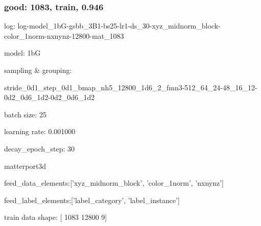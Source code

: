 \documentclass[,table,dvipsnames]{article}
\begin{document}
\subsubsection{good: 1083, train, 0.946}
log: log-model\_1bG-gsbb\_3B1-bs25-lr1-ds\_30-xyz\_midnorm\_block-color\_1norm-nxnynz-12800-mat\_1083 \par
model: 1bG \par
sampling \& grouping: \par stride\_0d1\_step\_0d1\_bmap\_nh5\_12800\_1d6\_2\_fmn3-512\_64\_24-48\_16\_12-0d2\_0d6\_1d2-0d2\_0d6\_1d2 \par
batch size: 25 \par
learning rate: 0.001000 \par
decay\_epoch\_step: 30 \par
matterport3d  \par
feed\_data\_elements:['xyz\_midnorm\_block', 'color\_1norm', 'nxnynz']  \par
feed\_label\_elements:['label\_category', 'label\_instance']  \par
train data shape: [ 1083 12800     9] \par
\end{document}
